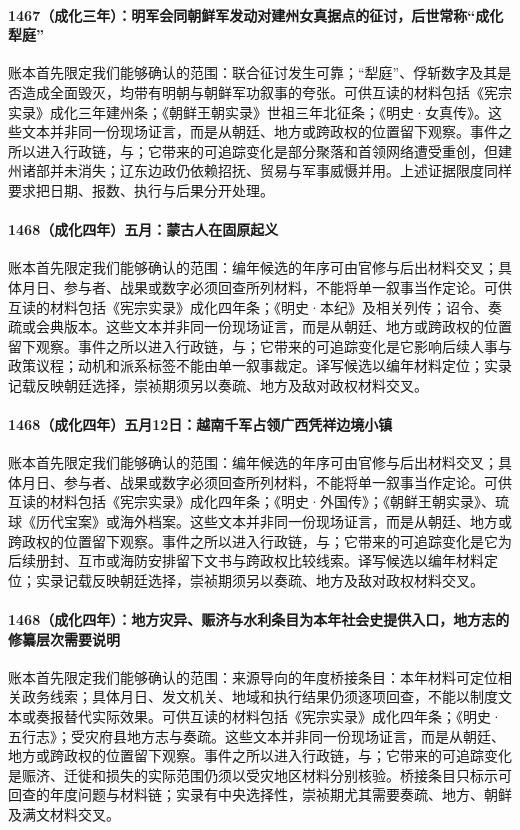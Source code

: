 \paragraph{1467（成化三年）：明军会同朝鲜军发动对建州女真据点的征讨，后世常称“成化犁庭”} 账本首先限定我们能够确认的范围：联合征讨发生可靠；“犁庭”、俘斩数字及其是否造成全面毁灭，均带有明朝与朝鲜军功叙事的夸张。可供互读的材料包括《宪宗实录》成化三年建州条；《朝鲜王朝实录》世祖三年北征条；《明史·女真传》。这些文本并非同一份现场证言，而是从朝廷、地方或跨政权的位置留下观察。事件之所以进入行政链，与；它带来的可追踪变化是部分聚落和首领网络遭受重创，但建州诸部并未消失；辽东边政仍依赖招抚、贸易与军事威慑并用。上述证据限度同样要求把日期、报数、执行与后果分开处理。

\paragraph{1468（成化四年）五月：蒙古人在固原起义} 账本首先限定我们能够确认的范围：编年候选的年序可由官修与后出材料交叉；具体月日、参与者、战果或数字必须回查所列材料，不能将单一叙事当作定论。可供互读的材料包括《宪宗实录》成化四年条；《明史·本纪》及相关列传；诏令、奏疏或会典版本。这些文本并非同一份现场证言，而是从朝廷、地方或跨政权的位置留下观察。事件之所以进入行政链，与；它带来的可追踪变化是它影响后续人事与政策议程；动机和派系标签不能由单一叙事裁定。译写候选以编年材料定位；实录记载反映朝廷选择，崇祯期须另以奏疏、地方及敌对政权材料交叉。

\paragraph{1468（成化四年）五月12日：越南千军占领广西凭祥边境小镇} 账本首先限定我们能够确认的范围：编年候选的年序可由官修与后出材料交叉；具体月日、参与者、战果或数字必须回查所列材料，不能将单一叙事当作定论。可供互读的材料包括《宪宗实录》成化四年条；《明史·外国传》；《朝鲜王朝实录》、琉球《历代宝案》或海外档案。这些文本并非同一份现场证言，而是从朝廷、地方或跨政权的位置留下观察。事件之所以进入行政链，与；它带来的可追踪变化是它为后续册封、互市或海防安排留下文书与跨政权比较线索。译写候选以编年材料定位；实录记载反映朝廷选择，崇祯期须另以奏疏、地方及敌对政权材料交叉。

\paragraph{1468（成化四年）：地方灾异、赈济与水利条目为本年社会史提供入口，地方志的修纂层次需要说明} 账本首先限定我们能够确认的范围：来源导向的年度桥接条目：本年材料可定位相关政务线索；具体月日、发文机关、地域和执行结果仍须逐项回查，不能以制度文本或奏报替代实际效果。可供互读的材料包括《宪宗实录》成化四年条；《明史·五行志》；受灾府县地方志与奏疏。这些文本并非同一份现场证言，而是从朝廷、地方或跨政权的位置留下观察。事件之所以进入行政链，与；它带来的可追踪变化是赈济、迁徙和损失的实际范围仍须以受灾地区材料分别核验。桥接条目只标示可回查的年度问题与材料链；实录有中央选择性，崇祯期尤其需要奏疏、地方、朝鲜及满文材料交叉。


